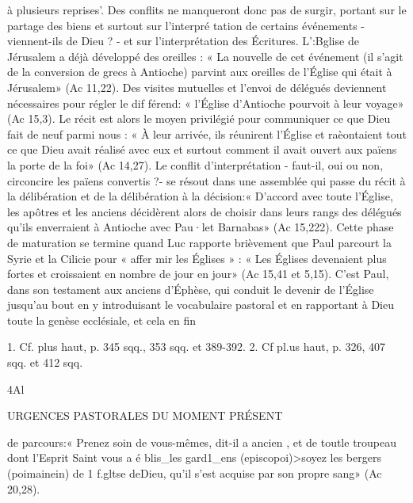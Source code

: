 à plusieurs reprises'. Des conflits ne manqueront donc pas de surgir, portant sur le partage des biens et surtout sur l'interpré­ tation de certains événements - viennent-ils de Dieu ? - et sur l'interprétation des Écritures. L':Bglise de Jérusalem a déjà développé des oreilles : « La nouvelle de cet événement (il s'agit de la conversion de grecs à Antioche) parvint aux oreilles de l'Église qui était à Jérusalem» (Ac 11,22). Des visites mutuelles et l'envoi de délégués deviennent nécessaires pour régler le dif­ férend: « l'Église d'Antioche pourvoit à leur voyage» (Ac 15,3). Le récit est alors le moyen privilégié pour communiquer ce que Dieu fait de neuf parmi nous : « À leur arrivée, ils réunirent l'Église et raèontaient tout ce que Dieu avait réalisé avec eux et surtout comment il avait ouvert aux païens la porte de la foi» (Ac 14,27). Le conflit d'interprétation - faut-il, oui ou non, circoncire les païens convertis ?- se résout dans une assemblée qui passe du récit à la délibération et de la délibération à la décision:« D'accord avec toute l'Église, les apôtres et les anciens
décidèrent alors de choisir dans leurs rangs des délégués qu'ils enverraient à Antioche avec Pau·let Barnabas» (Ac 15,222).
Cette phase de maturation se termine quand Luc rapporte brièvement que Paul parcourt la Syrie et la Cilicie pour « affer­ mir les Églises » : « Les Églises devenaient plus fortes et croissaient en nombre de jour en jour» (Ac 15,41 et 5,15). C'est Paul, dans son testament aux anciens d'Éphèse, qui conduit le devenir de l'Église jusqu'au bout en y introduisant le vocabulaire pastoral et en rapportant à Dieu toute la genèse ecclésiale, et cela en fin
 	
1.	Cf. plus haut, p. 345 sqq., 353 sqq. et 389-392.
2.	Cf pl.us haut, p. 326, 407 sqq. et 412 sqq.

4Al
 
URGENCES PASTORALES DU MOMENT PRÉSENT

de parcours:« Prenez soin de vous-mêmes, dit-il a  ancien , et de toutle troupeau dont l'Esprit Saint vous a é blis_les gard1_ens (episcopoi)>soyez les bergers (poimainein) de 1 f.gltse deDieu, qu'il s'est acquise par son propre sang» (Ac 20,28).

